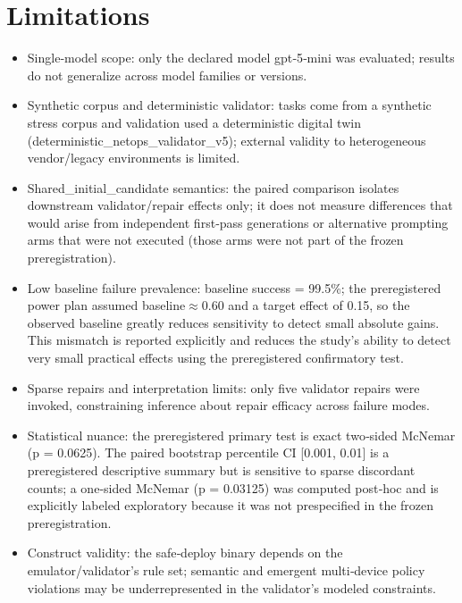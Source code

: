 \documentclass[conference]{IEEEtran}
\begin{document}
\section{Limitations}
\begin{itemize}
\item Single‑model scope: only the declared model gpt‑5‑mini was evaluated; results do not generalize across model families or versions.
\item Synthetic corpus and deterministic validator: tasks come from a synthetic stress corpus and validation used a deterministic digital twin (deterministic\_netops\_validator\_v5); external validity to heterogeneous vendor/legacy environments is limited.
\item Shared\_initial\_candidate semantics: the paired comparison isolates downstream validator/repair effects only; it does not measure differences that would arise from independent first‑pass generations or alternative prompting arms that were not executed (those arms were not part of the frozen preregistration).
\item Low baseline failure prevalence: baseline success = 99.5\%; the preregistered power plan assumed baseline\ensuremath{\approx}0.60 and a target effect of 0.15, so the observed baseline greatly reduces sensitivity to detect small absolute gains. This mismatch is reported explicitly and reduces the study's ability to detect very small practical effects using the preregistered confirmatory test.
\item Sparse repairs and interpretation limits: only five validator repairs were invoked, constraining inference about repair efficacy across failure modes.
\item Statistical nuance: the preregistered primary test is exact two‑sided McNemar (p = 0.0625). The paired bootstrap percentile CI [0.001, 0.01] is a preregistered descriptive summary but is sensitive to sparse discordant counts; a one‑sided McNemar (p = 0.03125) was computed post‑hoc and is explicitly labeled exploratory because it was not prespecified in the frozen preregistration.
\item Construct validity: the safe‑deploy binary depends on the emulator/validator's rule set; semantic and emergent multi‑device policy violations may be underrepresented in the validator's modeled constraints.
\end{itemize}
\end{document}
